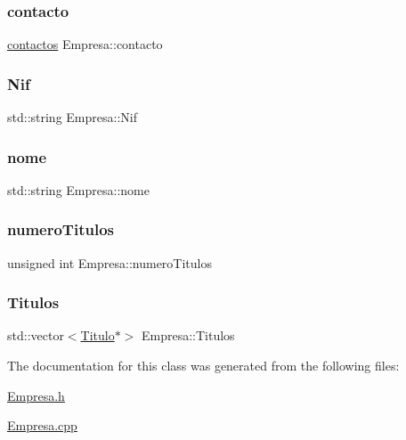 \subsubsection{\texorpdfstring{contacto}{contacto}}
{\footnotesize\ttfamily \mbox{\hyperlink{structcontactos}{contactos}} Empresa\+::contacto\hspace{0.3cm}{\ttfamily [private]}}

\mbox{\label{class_empresa_aac18efdd86c506c27a191fb0569b7b23}} 
\subsubsection{\texorpdfstring{Nif}{Nif}}
{\footnotesize\ttfamily std\+::string Empresa\+::\+Nif\hspace{0.3cm}{\ttfamily [private]}}

\mbox{\label{class_empresa_affa32f93b722be794531dbfb26cb19b3}} 
\subsubsection{\texorpdfstring{nome}{nome}}
{\footnotesize\ttfamily std\+::string Empresa\+::nome\hspace{0.3cm}{\ttfamily [private]}}

\mbox{\label{class_empresa_a375bf18365e4a52cc16ca5cdab7c8c5f}} 
\subsubsection{\texorpdfstring{numero\+Titulos}{numeroTitulos}}
{\footnotesize\ttfamily unsigned int Empresa\+::numero\+Titulos\hspace{0.3cm}{\ttfamily [private]}}

\mbox{\label{class_empresa_a02a71346cff2f286d265ed75e78bef36}} 
\subsubsection{\texorpdfstring{Titulos}{Titulos}}
{\footnotesize\ttfamily std\+::vector$<$\mbox{\hyperlink{class_titulo}{Titulo}}$\ast$$>$ Empresa\+::\+Titulos\hspace{0.3cm}{\ttfamily [private]}}



The documentation for this class was generated from the following files\+:\begin{DoxyCompactItemize}
\item 
\mbox{\hyperlink{_empresa_8h}{Empresa.\+h}}\item 
\mbox{\hyperlink{_empresa_8cpp}{Empresa.\+cpp}}\end{DoxyCompactItemize}
